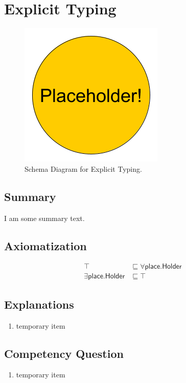 \section{Explicit Typing}
\label{sec:Explicit}
\begin{figure}[h!]
\begin{center}
\includegraphics[width=.4\textwidth]{figures/placeholder}
\end{center}
\caption{Schema Diagram for Explicit Typing.}
\label{fig:Explicit}
\end{figure}
\subsection{Summary}
\label{sum:Explicit}
I am some summary text.

\subsection{Axiomatization}
\label{axs:Explicit}
\begin{align}
\top &\sqsubseteq \forall\textsf{place.Holder} \\ 
\exists\textsf{place.Holder} &\sqsubseteq \top 
\end{align}

\subsection{Explanations}
\label{exp:Explicit}
\begin{enumerate}
\item temporary item
\end{enumerate}

\subsection{Competency Question}
\label{cqs:Explicit}
\begin{enumerate}[CQ1.]
\item temporary item
\end{enumerate}

\newpage
